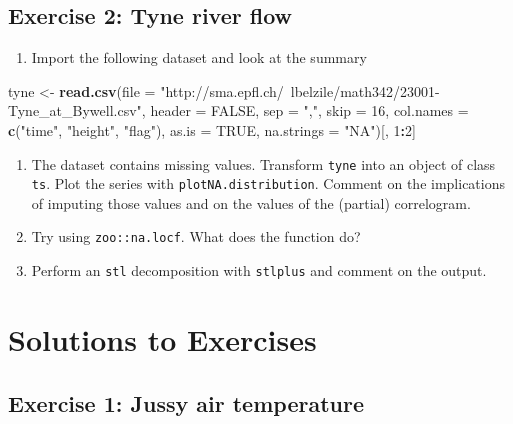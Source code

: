 \documentclass[]{book}
\newenvironment{Shaded}{\begin{snugshade}}{\end{snugshade}}
\newcommand{\KeywordTok}[1]{\textcolor[rgb]{0.13,0.29,0.53}{\textbf{#1}}}
\newcommand{\DataTypeTok}[1]{\textcolor[rgb]{0.13,0.29,0.53}{#1}}
\newcommand{\DecValTok}[1]{\textcolor[rgb]{0.00,0.00,0.81}{#1}}
\newcommand{\StringTok}[1]{\textcolor[rgb]{0.31,0.60,0.02}{#1}}
\newcommand{\OtherTok}[1]{\textcolor[rgb]{0.56,0.35,0.01}{#1}}
\newcommand{\OperatorTok}[1]{\textcolor[rgb]{0.81,0.36,0.00}{\textbf{#1}}}
\newcommand{\NormalTok}[1]{#1}
\providecommand{\tightlist}{%
  \setlength{\itemsep}{0pt}\setlength{\parskip}{0pt}}
\begin{document}
\subsection{Exercise 2: Tyne river
flow}\label{exercise-2-tyne-river-flow}

\begin{enumerate}
\def\labelenumi{\arabic{enumi}.}
\tightlist
\item
  Import the following dataset and look at the summary
\end{enumerate}

\begin{Shaded}
\begin{Highlighting}[]
\NormalTok{tyne <-}\StringTok{ }\KeywordTok{read.csv}\NormalTok{(}\DataTypeTok{file =} \StringTok{"http://sma.epfl.ch/~lbelzile/math342/23001-Tyne_at_Bywell.csv"}\NormalTok{, }
    \DataTypeTok{header =} \OtherTok{FALSE}\NormalTok{, }\DataTypeTok{sep =} \StringTok{","}\NormalTok{, }\DataTypeTok{skip =} \DecValTok{16}\NormalTok{, }\DataTypeTok{col.names =} \KeywordTok{c}\NormalTok{(}\StringTok{"time"}\NormalTok{, }\StringTok{"height"}\NormalTok{, }\StringTok{"flag"}\NormalTok{), }
    \DataTypeTok{as.is =} \OtherTok{TRUE}\NormalTok{, }\DataTypeTok{na.strings =} \StringTok{"NA"}\NormalTok{)[, }\DecValTok{1}\OperatorTok{:}\DecValTok{2}\NormalTok{]}
\end{Highlighting}
\end{Shaded}

\begin{enumerate}
\def\labelenumi{\arabic{enumi}.}
\setcounter{enumi}{1}
\tightlist
\item
  The dataset contains missing values. Transform \texttt{tyne} into an
  object of class \texttt{ts}. Plot the series with
  \texttt{plotNA.distribution}. Comment on the implications of imputing
  those values and on the values of the (partial) correlogram.
\item
  Try using \texttt{zoo::na.locf}. What does the function do?
\item
  Perform an \texttt{stl} decomposition with \texttt{stlplus} and
  comment on the output.
\end{enumerate}

\section{Solutions to Exercises}\label{solutions-to-exercises-3}

\subsection{Exercise 1: Jussy air
temperature}\label{exercise-1-jussy-air-temperature-1}
\end{document}
